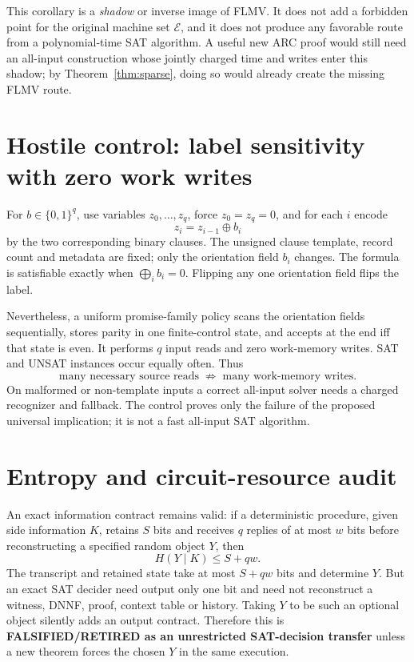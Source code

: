 \documentclass[11pt]{article}
\begin{document}
This corollary is a \emph{shadow} or inverse image of FLMV.  It does not add a
forbidden point for the original machine set $\mathcal E$, and it does not
produce any favorable route from a polynomial-time SAT algorithm.  A useful
new ARC proof would still need an all-input construction whose jointly
charged time and writes enter this shadow; by Theorem~\ref{thm:sparse}, doing
so would already create the missing FLMV route.

\section{Hostile control: label sensitivity with zero work writes}
For $b\in\{0,1\}^q$, use variables $z_0,\ldots,z_q$, force $z_0=z_q=0$, and
for each $i$ encode
\[
 z_i=z_{i-1}\oplus b_i
\]
by the two corresponding binary clauses.  The unsigned clause template,
record count and metadata are fixed; only the orientation field $b_i$
changes.  The formula is satisfiable exactly when
$\bigoplus_i b_i=0$.  Flipping any one orientation field flips the label.

Nevertheless, a uniform promise-family policy scans the orientation fields
sequentially, stores parity in one finite-control state, and accepts at the
end iff that state is even.  It performs $q$ input reads and zero work-memory
writes.  SAT and UNSAT instances occur equally often.  Thus
\[
 \text{many necessary source reads}\;\not\Rightarrow\;
 \text{many work-memory writes}.
\]
On malformed or non-template inputs a correct all-input solver needs a
charged recognizer and fallback.  The control proves only the failure of the
proposed universal implication; it is not a fast all-input SAT algorithm.

\section{Entropy and circuit-resource audit}
An exact information contract remains valid: if a deterministic procedure,
given side information $K$, retains $S$ bits and receives $q$ replies of at
most $w$ bits before reconstructing a specified random object $Y$, then
\[
 H(Y\mid K)\le S+qw.
\]
The transcript and retained state take at most $S+qw$ bits and determine
$Y$.  But an exact SAT decider need output only one bit and need not
reconstruct a witness, DNNF, proof, context table or history.  Taking $Y$ to
be such an optional object silently adds an output contract.  Therefore this
is \textbf{FALSIFIED/RETIRED as an unrestricted SAT-decision transfer} unless
a new theorem forces the chosen $Y$ in the same execution.
\end{document}

